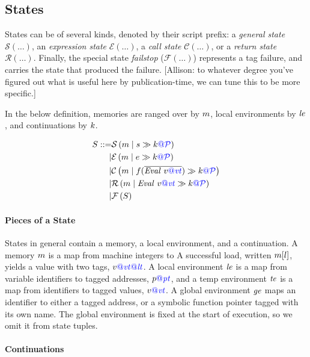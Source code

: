 \documentclass{llncs}
\begin{document}
\subsection{States}

States can be of several kinds, denoted by their script prefix: a {\em general state} \(\mathcal{S}(\dots)\),
an {\em expression state} \(\mathcal{E}(\dots)\), a {\em call state} \(\mathcal{C}(\dots)\), or a
{\em return state} \(\mathcal{R}(\dots)\). Finally, the special state {\em failstop} (\(\mathcal{F}(\dots)\))
represents a tag failure, and carries the state that produced the failure.
[Allison: to whatever degree you've figured out what is useful here by publication-time, we can
  tune this to be more specific.]

In the below definition, memories are ranged over by \(m\), local environments by
\(\mathit{le}\), and continuations by \(k\).

\[\begin{aligned}
S ::= & \mathcal{S}\left(m \mid s \gg k {\color{blue} {\color{blue} @} \mathcal{\color{blue} P\mathit{}}}\right) \\
| & \mathcal{E}\left(m \mid e \gg k {\color{blue} {\color{blue} @} \mathcal{\color{blue} P\mathit{}}}\right) \\
| & \mathcal{C}\left(m \mid f(\overline{\mathit{Eval} ~ v{\color{blue} @}\mathit{\color{blue} vt}}) \gg k {\color{blue} {\color{blue} @} \mathcal{\color{blue} P\mathit{}}}\right) \\
| & \mathcal{R}\left(m \mid \mathit{Eval} ~ v{\color{blue} @}\mathit{\color{blue} vt} \gg k {\color{blue} {\color{blue} @} \mathcal{\color{blue} P\mathit{}}}\right) \\
| & \mathcal{F}\left(S\right) \\
\end{aligned}\]

\paragraph*{Pieces of a State}

States in general contain a memory, a local environment, and a continuation.
A memory \(m\) is a map from machine integers to 
A successful load, written \(m[l]\), yields a value with two tags, \(v{\color{blue} @}\mathit{\color{blue} vt}{\color{blue} @}\mathit{\color{blue} lt}\).
A local environment \(\mathit{le}\) is a map from variable identifiers to tagged addresses,
\(p{\color{blue} @}\mathit{\color{blue} pt}\), and a temp environment \(\mathit{te}\) is a map from identifiers to tagged values,
\(v{\color{blue} @}\mathit{\color{blue} vt}\). A global environment \(\mathit{ge}\) maps an identifier to either a tagged address,
or a symbolic function pointer tagged with its own name.
The global environment is fixed at the start of execution, so we omit it from state tuples.

\paragraph*{Continuations}
\label{app:continuations}
\end{document}
